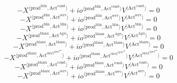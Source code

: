 \begin{equation}
-{X}^{\langle \mathrm{prod}^{\mathrm{Min}},\mathrm{Act}^{\mathrm{const}}\rangle} + {{{i\!o}}^{\langle \mathrm{\mathrm{prod}^{\mathrm{Min}}},\mathrm{\mathrm{Act}^{\mathrm{const}}}\rangle}} {{V}^{\langle \mathrm{Act}^{\mathrm{const}}\rangle}} = 0
\end{equation}
\begin{equation}
-{X}^{\langle \mathrm{prod}^{\mathrm{Min}},\mathrm{Act}^{\mathrm{serv}}\rangle} + {{{i\!o}}^{\langle \mathrm{\mathrm{prod}^{\mathrm{Min}}},\mathrm{\mathrm{Act}^{\mathrm{serv}}}\rangle}} {{V}^{\langle \mathrm{Act}^{\mathrm{serv}}\rangle}} = 0
\end{equation}
\begin{equation}
-{X}^{\langle \mathrm{prod}^{\mathrm{Min}},\mathrm{Act}^{\mathrm{Min}}\rangle} + {{{i\!o}}^{\langle \mathrm{\mathrm{prod}^{\mathrm{Min}}},\mathrm{\mathrm{Act}^{\mathrm{Min}}}\rangle}} {{V}^{\langle \mathrm{Act}^{\mathrm{Min}}\rangle}} = 0
\end{equation}
\begin{equation}
-{X}^{\langle \mathrm{prod}^{\mathrm{Manu}},\mathrm{Act}^{\mathrm{Agri}}\rangle} + {{{i\!o}}^{\langle \mathrm{\mathrm{prod}^{\mathrm{Manu}}},\mathrm{\mathrm{Act}^{\mathrm{Agri}}}\rangle}} {{V}^{\langle \mathrm{Act}^{\mathrm{Agri}}\rangle}} = 0
\end{equation}
\begin{equation}
-{X}^{\langle \mathrm{prod}^{\mathrm{Manu}},\mathrm{Act}^{\mathrm{Manu}}\rangle} + {{{i\!o}}^{\langle \mathrm{\mathrm{prod}^{\mathrm{Manu}}},\mathrm{\mathrm{Act}^{\mathrm{Manu}}}\rangle}} {{V}^{\langle \mathrm{Act}^{\mathrm{Manu}}\rangle}} = 0
\end{equation}
\begin{equation}
-{X}^{\langle \mathrm{prod}^{\mathrm{Manu}},\mathrm{Act}^{\mathrm{elect}^{\mathrm{agua}^{\mathrm{gas}}}}\rangle} + {{{i\!o}}^{\langle \mathrm{\mathrm{prod}^{\mathrm{Manu}}},\mathrm{\mathrm{Act}^{\mathrm{elect}^{\mathrm{agua}^{\mathrm{gas}}}}}\rangle}} {{V}^{\langle \mathrm{Act}^{\mathrm{elect}^{\mathrm{agua}^{\mathrm{gas}}}}\rangle}} = 0
\end{equation}
\begin{equation}
-{X}^{\langle \mathrm{prod}^{\mathrm{Manu}},\mathrm{Act}^{\mathrm{const}}\rangle} + {{{i\!o}}^{\langle \mathrm{\mathrm{prod}^{\mathrm{Manu}}},\mathrm{\mathrm{Act}^{\mathrm{const}}}\rangle}} {{V}^{\langle \mathrm{Act}^{\mathrm{const}}\rangle}} = 0
\end{equation}
\begin{equation}
-{X}^{\langle \mathrm{prod}^{\mathrm{Manu}},\mathrm{Act}^{\mathrm{serv}}\rangle} + {{{i\!o}}^{\langle \mathrm{\mathrm{prod}^{\mathrm{Manu}}},\mathrm{\mathrm{Act}^{\mathrm{serv}}}\rangle}} {{V}^{\langle \mathrm{Act}^{\mathrm{serv}}\rangle}} = 0
\end{equation}
